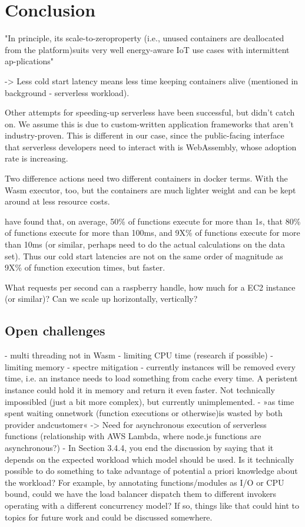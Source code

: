 \chapter{Conclusion}
\label{chapter:conclusion}

"In principle, its scale-to-zeroproperty (i.e., unused containers are deallocated from the platform)suits very well energy-aware IoT use cases with intermittent ap-plications" \cite{Aslanpour2021}

-> Less cold start latency means less time keeping containers alive (mentioned in background - serverless workload).

Other attempts for speeding-up serverless have been successful, but didn't catch on. We assume this is due to custom-written application frameworks that aren't industry-proven. This is different in our case, since the public-facing interface that serverless developers need to interact with is WebAssembly, whose adoption rate is increasing.

Two difference actions need two different containers in docker terms. With the Wasm executor, too, but the containers are much lighter weight and can be kept around at less resource costs.

\citeauthor{Shahrad2020} have found that, on average, 50\% of functions execute for more than 1s, that 80\% of functions execute for more than 100ms, and 9X\% of functions execute for more than 10ms (or similar, perhaps need to do the actual calculations on the data set). Thus our cold start latencies are not on the same order of magnitude as 9X\% of function execution times, but faster.

What requests per second can a raspberry handle, how much for a EC2 instance (or similar)? Can we scale up horizontally, vertically?

\section{Open challenges}

- multi threading not in Wasm
- limiting CPU time (research if possible)
- limiting memory
- spectre mitigation
- currently instances will be removed every time, i.e. an instance needs to load something from cache every time. A peristent instance could hold it in memory and return it even faster. Not technically impossibled (just a bit more complex), but currently unimplemented.
- »as ​​time ​​spent ​​waiting on ​​network ​​(function ​​executions ​​or ​​otherwise)is ​​wasted ​​by ​​both ​​provider ​and ​customer« \citeauthor{Fox2017} -> Need for asynchronous execution of serverless functions (relationship with AWS Lambda, where node.js functions are asynchronous?)
- In Section 3.4.4, you end the discussion by saying that it depends on the expected workload which model should be used. Is it technically possible to do something to take advantage of potential a priori knowledge about the workload? For example, by annotating functions/modules as I/O or CPU bound, could we have the load balancer dispatch them to different invokers operating with a different concurrency model? If so, things like that could hint to topics for future work and could be discussed somewhere. 
